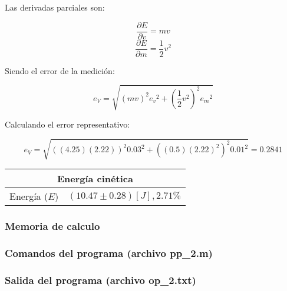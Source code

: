 \documentclass[letter,11pt]{article}
\begin{document}
Las derivadas parciales son:

\begin{equation}
    \frac{\partial{E}}{\partial{v}} = m v
\end{equation}
\begin{equation}
    \frac{\partial{E}}{\partial{m}} = \frac{1}{2} v^2
\end{equation}

Siendo el error de la medición:

\begin{equation}
    e_V = \sqrt{
        \left(m v\right)^2{e_{v}}^2+
        \left(\frac{1}{2} v^2 \right)^2{e_{m}}^2
    }
\end{equation}

Calculando el error representativo:

\begin{equation*}
    e_V = \sqrt{
        \left((4.25)(2.22)\right)^2{0.03}^2+
        \left((0.5)(2.22)^2\right)^2{0.01}^2
    } = 0.2841
\end{equation*}

\begin{center}
\begin{tabular}{|c|>{\centering}m{5.0cm}<{\centering}|}
\hline
\multicolumn{2}{|c|}{\textbf{Energía cinética}}
\tabularnewline \hline
Energía ($E$) & $(10.47 \pm 0.28)[J], 2.71\%$ \tabularnewline \hline
\end{tabular}
\end{center}

\subsubsection{Memoria de calculo}

\subsubsection{Comandos del programa (archivo pp\_2.m)}
\begin{alltt}
\footnotesize

\normalsize
\end{alltt}

\subsubsection{Salida del programa (archivo op\_2.txt)}
\begin{alltt}
\footnotesize

\normalsize
\end{alltt}
\end{document}
